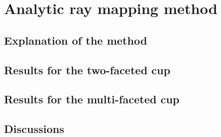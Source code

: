 \chapter{Analytic ray mapping method}
\section{Explanation of the method}
\section{Results for the two-faceted cup}
\section{Results for the multi-faceted cup}
\section{Discussions}